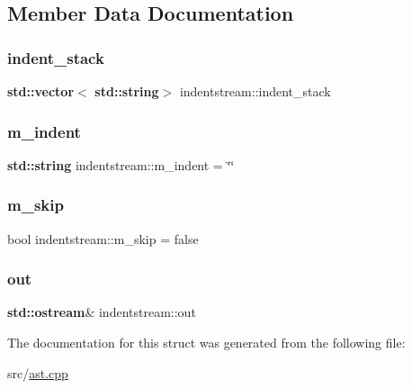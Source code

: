 \subsection{Member Data Documentation}
\mbox{\label{structindentstream_aad5afd8fa7ab3f0151a60fbbd07d7d9f}} 
\subsubsection{\texorpdfstring{indent\+\_\+stack}{indent\_stack}}
{\footnotesize\ttfamily \textbf{ std\+::vector}$<$\textbf{ std\+::string}$>$ indentstream\+::indent\+\_\+stack}

\mbox{\label{structindentstream_a679f1453bdd2a44b50d75e08e92132bc}} 
\subsubsection{\texorpdfstring{m\+\_\+indent}{m\_indent}}
{\footnotesize\ttfamily \textbf{ std\+::string} indentstream\+::m\+\_\+indent = \char`\"{}\char`\"{}}

\mbox{\label{structindentstream_a79ad9a59e1315f8b6c29826a3684ad4a}} 
\subsubsection{\texorpdfstring{m\+\_\+skip}{m\_skip}}
{\footnotesize\ttfamily bool indentstream\+::m\+\_\+skip = false}

\mbox{\label{structindentstream_a17982da2855e0f5ef4f7b7408bd41883}} 
\subsubsection{\texorpdfstring{out}{out}}
{\footnotesize\ttfamily \textbf{ std\+::ostream}\& indentstream\+::out}



The documentation for this struct was generated from the following file\+:\begin{DoxyCompactItemize}
\item 
src/\hyperlink{ast_8cpp}{ast.\+cpp}\end{DoxyCompactItemize}
